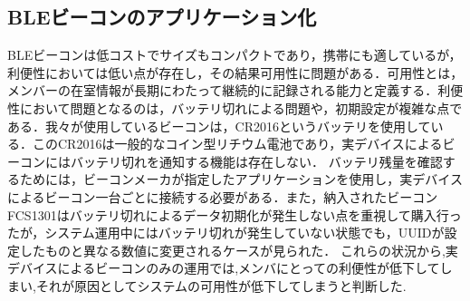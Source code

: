 


\subsection{ BLEビーコンのアプリケーション化}


BLEビーコンは低コストでサイズもコンパクトであり，携帯にも適しているが，利便性においては低い点が存在し，その結果可用性に問題がある．可用性とは，メンバーの在室情報が長期にわたって継続的に記録される能力と定義する．利便性において問題となるのは，バッテリ切れによる問題や，初期設定が複雑な点である．我々が使用しているビーコンは，CR2016というバッテリを使用している．このCR2016は一般的なコイン型リチウム電池であり，実デバイスによるビーコンにはバッテリ切れを通知する機能は存在しない．
バッテリ残量を確認するためには，ビーコンメーカが指定したアプリケーションを使用し，実デバイスによるビーコン一台ごとに接続する必要がある．また，納入されたビーコンFCS1301はバッテリ切れによるデータ初期化が発生しない点を重視して購入行ったが，システム運用中にはバッテリ切れが発生していない状態でも，UUIDが設定したものと異なる数値に変更されるケースが見られた．
これらの状況から,実デバイスによるビーコンのみの運用では,メンバにとっての利便性が低下してしまい,それが原因としてシステムの可用性が低下してしまうと判断した.



